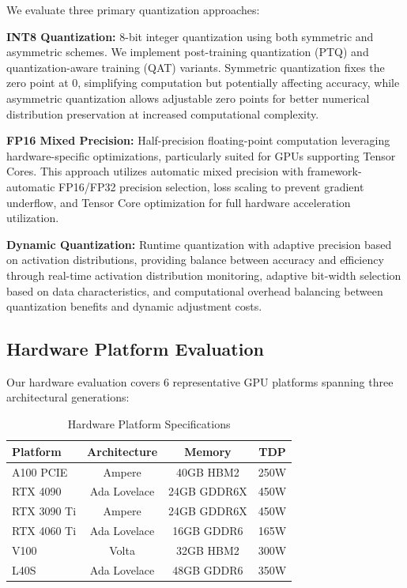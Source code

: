 \documentclass[sigconf,review]{acmart}
\begin{document}
We evaluate three primary quantization approaches:

\textbf{INT8 Quantization:} 8-bit integer quantization using both symmetric and asymmetric schemes. We implement post-training quantization (PTQ) and quantization-aware training (QAT) variants. Symmetric quantization fixes the zero point at 0, simplifying computation but potentially affecting accuracy, while asymmetric quantization allows adjustable zero points for better numerical distribution preservation at increased computational complexity.

\textbf{FP16 Mixed Precision:} Half-precision floating-point computation leveraging hardware-specific optimizations, particularly suited for GPUs supporting Tensor Cores. This approach utilizes automatic mixed precision with framework-automatic FP16/FP32 precision selection, loss scaling to prevent gradient underflow, and Tensor Core optimization for full hardware acceleration utilization.

\textbf{Dynamic Quantization:} Runtime quantization with adaptive precision based on activation distributions, providing balance between accuracy and efficiency through real-time activation distribution monitoring, adaptive bit-width selection based on data characteristics, and computational overhead balancing between quantization benefits and dynamic adjustment costs.

\subsection{Hardware Platform Evaluation}

Our hardware evaluation covers 6 representative GPU platforms spanning three architectural generations:

\begin{table}[h]
\centering
\caption{Hardware Platform Specifications}
\small
\begin{tabular}{@{}lccc@{}}
\toprule
\textbf{Platform} & \textbf{Architecture} & \textbf{Memory} & \textbf{TDP} \\
\midrule
A100 PCIE & Ampere & 40GB HBM2 & 250W \\
RTX 4090 & Ada Lovelace & 24GB GDDR6X & 450W \\
RTX 3090 Ti & Ampere & 24GB GDDR6X & 450W \\
RTX 4060 Ti & Ada Lovelace & 16GB GDDR6 & 165W \\
V100 & Volta & 32GB HBM2 & 300W \\
L40S & Ada Lovelace & 48GB GDDR6 & 350W \\
\bottomrule
\end{tabular}
\end{table}
\end{document}

